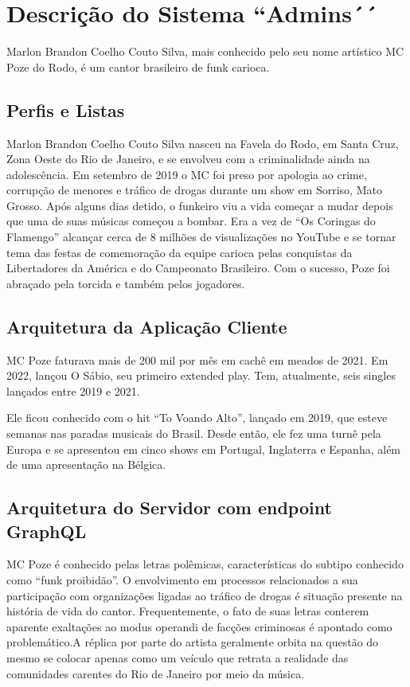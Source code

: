 \chapter{Descrição do Sistema ``Admins´´}
\label{chap4}

Marlon Brandon Coelho Couto Silva, mais conhecido pelo seu nome artístico MC Poze do Rodo, é um cantor brasileiro de funk carioca.

\section{Perfis e Listas}

Marlon Brandon Coelho Couto Silva nasceu na Favela do Rodo, em Santa Cruz, Zona Oeste do Rio de Janeiro, e se envolveu com a criminalidade ainda na adolescência. Em setembro de 2019 o MC foi preso por apologia ao crime, corrupção de menores e tráfico de drogas durante um show em Sorriso, Mato Grosso. Após alguns dias detido, o funkeiro viu a vida começar a mudar depois que uma de suas músicas começou a bombar. Era a vez de ``Os Coringas do Flamengo'' alcançar cerca de 8 milhões de visualizações no YouTube e se tornar tema das festas de comemoração da equipe carioca pelas conquistas da Libertadores da América e do Campeonato Brasileiro. Com o sucesso, Poze foi abraçado pela torcida e também pelos jogadores.

\section{Arquitetura da Aplicação Cliente}

MC Poze faturava mais de 200 mil por mês em cachê em meados de 2021. Em 2022, lançou O Sábio, seu primeiro extended play. Tem, atualmente, seis singles lançados entre 2019 e 2021.

Ele ficou conhecido com o hit ``To Voando Alto'', lançado em 2019, que esteve semanas nas paradas musicais do Brasil. Desde então, ele fez uma turnê pela Europa e se apresentou em cinco shows em Portugal, Inglaterra e Espanha, além de uma apresentação na Bélgica.

\section{Arquitetura do Servidor com endpoint GraphQL}

MC Poze é conhecido pelas letras polêmicas, características do subtipo conhecido como ``funk proibidão''. O envolvimento em processos relacionados a sua participação com organizações ligadas ao tráfico de drogas é situação presente na história de vida do cantor. Frequentemente, o fato de suas letras conterem aparente exaltações ao modus operandi de facções criminosas é apontado como problemático.A réplica por parte do artista geralmente orbita na questão do mesmo se colocar apenas como um veículo que retrata a realidade das comunidades carentes do Rio de Janeiro por meio da música.